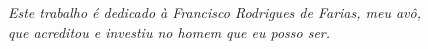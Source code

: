 \begin{dedicatoria}
   \vspace*{\fill}
   \centering
   \noindent
   \textit{Este trabalho é dedicado à Francisco Rodrigues de Farias, meu avô,\\
   que acreditou e investiu no homem que eu posso ser.} \vspace*{\fill}
\end{dedicatoria}
